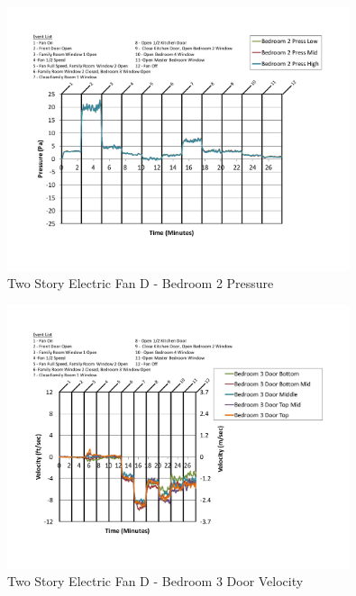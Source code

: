 \documentclass{article}
\begin{document}
\begin{appendices}
	\begin{figure}[H]
		\centering
		\includegraphics[height=3.05in,trim=0.67in 1.1in 0.67in 0.8in,clip=true]{0_Images/Results_Charts/ColdFlow/Two_Story/Electric/D/Bedroom_2_Pressure.pdf}
		\caption{Two Story Electric Fan D - Bedroom 2 Pressure}
	\end{figure}
 

	\begin{figure}[H]
		\centering
		\includegraphics[height=3.05in,trim=0.67in 1.1in 0.67in 0.8in,clip=true]{0_Images/Results_Charts/ColdFlow/Two_Story/Electric/D/Bedroom_3_Door_Velocity.pdf}
		\caption{Two Story Electric Fan D - Bedroom 3 Door Velocity}
	\end{figure}
 
	\clearpage


\end{appendices}
\end{document}
